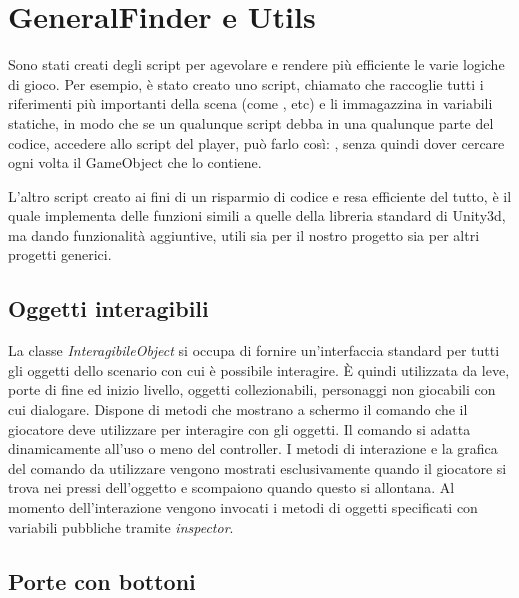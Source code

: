 \section{GeneralFinder e Utils}

Sono stati creati degli script per agevolare e rendere più efficiente le varie logiche di gioco. Per esempio, è stato creato uno script, chiamato  che raccoglie tutti i riferimenti più importanti della scena (come ,  etc) e li immagazzina in variabili statiche, in modo che se un qualunque script debba in una qualunque parte del codice, accedere allo script del player, può farlo così: , senza quindi dover cercare ogni volta il GameObject che lo contiene.

L'altro script creato ai fini di un risparmio di codice e resa efficiente del tutto, è  il quale implementa delle funzioni simili a quelle della libreria standard di Unity3d, ma dando funzionalità aggiuntive, utili sia per il nostro progetto sia per altri progetti generici.

\subsection{Oggetti interagibili}

La classe \textit{InteragibileObject} si occupa di fornire un’interfaccia standard per tutti gli oggetti dello scenario con cui è possibile interagire. È quindi utilizzata da leve, porte di fine ed inizio livello, oggetti collezionabili, personaggi non giocabili con cui dialogare. Dispone di metodi che mostrano a schermo il comando che il giocatore deve utilizzare per interagire con gli oggetti. Il comando si adatta dinamicamente all’uso o meno del controller.
I metodi di interazione e la grafica del comando da utilizzare vengono mostrati esclusivamente quando il giocatore si trova nei pressi dell’oggetto e scompaiono quando questo si allontana.
Al momento dell’interazione vengono invocati i metodi di oggetti specificati con variabili pubbliche tramite \textit{inspector}.

\subsection{Porte con bottoni}

